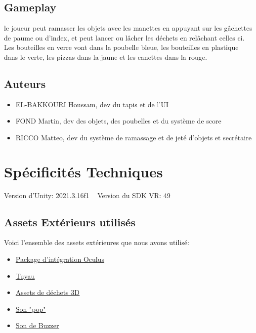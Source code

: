 \documentclass[a4paper,french,12pt]{article}
\begin{document}
\subsection{Gameplay}
le joueur peut ramasser les objets avec les manettes en appuyant sur les gâchettes de paume ou d'index, et peut lancer ou lâcher les déchets en relâchant celles ci.
Les bouteilles en verre vont dans la poubelle bleue, les bouteilles en plastique dans le verte, les pizzas dans la jaune et les canettes dans la rouge.

\subsection{Auteurs}
\begin{itemize}
\item EL-BAKKOURI Houssam, dev du tapis et de l'UI
\item FOND Martin, dev des objets, des poubelles et du système de score
\item RICCO Matteo, dev du système de ramassage et de jeté d'objets et secrétaire
\end{itemize}

\section{Spécificités Techniques}

Version d'Unity: 2021.3.16f1
~
Version du SDK VR: 49
~

\subsection{Assets Extérieurs utilisés}

Voici l'ensemble des assets extérieures que nous avons utilisé:
\begin{itemize}
\item \href{http://https://assetstore.unity.com/packages/tools/integration/oculus-integration-82022}{Package d'intégration Oculus} 

\item \href{https://sketchfab.com/3d-models/low-poly-bend-pipe-09684bff3d414a8eaa09d428313f105d}
{Tuyau}
\item \href{https://www.cgtrader.com/free-3d-models/exterior/street-exterior/trashes}{Assets de déchets 3D}


\item \href{https://www.youtube.com/watch?v=7cPTWhj3tng}{Son "pop"}

\item \href{https://www.youtube.com/watch?v=2naim9F4010}{Son de Buzzer}

\end{itemize}
\end{document}
